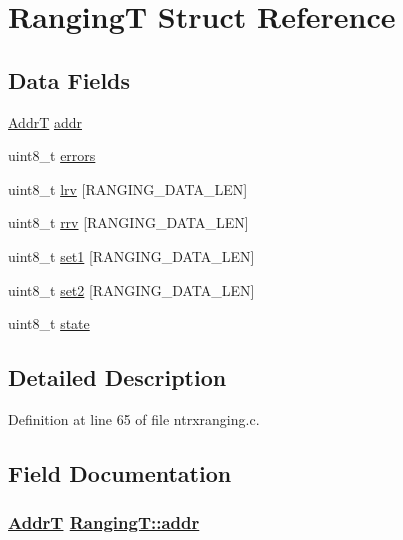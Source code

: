 \hypertarget{structRangingT}{
\section{Ranging\-T Struct Reference}
\label{structRangingT}
}
\subsection*{Data Fields}
\begin{CompactItemize}
\item 
\hyperlink{ntrxtypes_8h_9763ea343e88d0129a49347a4b2ff676}{Addr\-T} \hyperlink{structRangingT_018a9cb2a22c1041010b887d07a83d70}{addr}
\item 
uint8\_\-t \hyperlink{structRangingT_215921081ad3adb2e4eaf6ee121e1015}{errors}
\item 
uint8\_\-t \hyperlink{structRangingT_2709b7cecea01e61e4a1664b8b639fc3}{lrv} \mbox{[}RANGING\_\-DATA\_\-LEN\mbox{]}
\item 
uint8\_\-t \hyperlink{structRangingT_02e77ce88b8c2b7e44b0970a7ae94bd0}{rrv} \mbox{[}RANGING\_\-DATA\_\-LEN\mbox{]}
\item 
uint8\_\-t \hyperlink{structRangingT_2b35c473cc31e5b390bc2c2a92810661}{set1} \mbox{[}RANGING\_\-DATA\_\-LEN\mbox{]}
\item 
uint8\_\-t \hyperlink{structRangingT_65e8530970fa6a0345100b05ad59aefa}{set2} \mbox{[}RANGING\_\-DATA\_\-LEN\mbox{]}
\item 
uint8\_\-t \hyperlink{structRangingT_ba98588af40243a4178517deb33d22a6}{state}
\end{CompactItemize}


\subsection{Detailed Description}




Definition at line 65 of file ntrxranging.c.

\subsection{Field Documentation}
\hypertarget{structRangingT_018a9cb2a22c1041010b887d07a83d70}{
\subsubsection[addr]{\setlength{\rightskip}{0pt plus 5cm}\hyperlink{ntrxtypes_8h_9763ea343e88d0129a49347a4b2ff676}{Addr\-T} \hyperlink{structRangingT_018a9cb2a22c1041010b887d07a83d70}{Ranging\-T::addr}}}
\label{structRangingT_018a9cb2a22c1041010b887d07a83d70}


